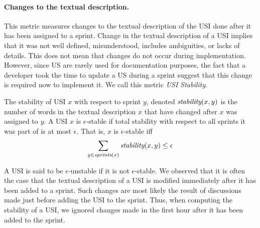 \paragraph{Changes to the textual description.}
This metric measures changes to the textual description of the USI done after it has been assigned to a sprint. 
Change in the textual description of a USI implies that it was not well defined, misunderstood, includes ambiguities, or lacks of details. 
This does not mean that changes do not occur during implementation. 
However, since US are rarely used for documentation purposes, the fact that a developer took the time to update a US during a sprint suggest that this change is required now to implement it. 
We call this metric \emph{USI Stability}. 
\begin{definition}[Stability] 
The stability of USI $x$ with respect to sprint $y$, denoted $\textit{stability}(x,y)$ is the number of words in the textual description $x$ that have changed after $x$ was assigned to $y$. 
A USI $x$ is $\epsilon$-stable if total stability with respect to all sprints it was part of is at most $\epsilon$. 
That is, $x$ is $\epsilon$-stable iff 
\begin{equation}
    \sum_{y\in\textit{sprints}(x)}\textit{stability}(x,y)\leq \epsilon
\end{equation} 
\label{def:stability}
\end{definition}
A USI is said to be $\epsilon$-unstable if it is not $\epsilon$-stable. 
We observed that it is often the case that the textual description of a USI is modified immediately after it has been added to a sprint. Such changes are most likely the result of discussions made just before adding the USI to the sprint. Thus, when computing the stability of a USI, we ignored changes made in the first hour after it has been added to the sprint. 




